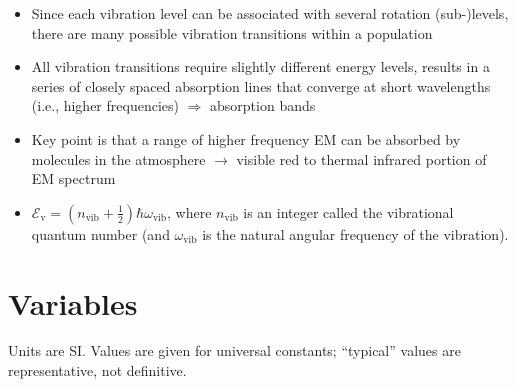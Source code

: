 \documentclass[11pt, oneside]{article}
\begin{document}
\begin{itemize}
\begin{itemize}
\begin{itemize}
\begin{itemize}
				\item[$\hookrightarrow$] Since each vibration level can be associated with several rotation (sub-)levels, there are many possible vibration transitions within a population
				\item[$\hookrightarrow$] All vibration transitions require slightly different energy levels, results in a series of closely spaced absorption lines that converge at short wavelengths (i.e., higher frequencies) $\Rightarrow$ absorption bands
				\item[$\hookrightarrow$] Key point is that a range of higher frequency EM can be absorbed by molecules in the atmosphere $\rightarrow$ visible red to thermal infrared portion of EM spectrum
				\item[$\hookrightarrow$] $\mathcal{E}_\mathrm{v} = \left(n_\mathrm{vib} + \tfrac{1}{2}\right)\hbar\omega_\mathrm{vib}$, where $n_\mathrm{vib}$ is an integer called the vibrational quantum number (and $\omega_\mathrm{vib}$ is the natural angular frequency of the vibration).
			\end{itemize}
		\end{itemize}
	\end{itemize}
\end{itemize}

\clearpage
\section*{Variables}

Units are SI. Values are given for universal constants; ``typical'' values are representative, not definitive.
\end{document}
